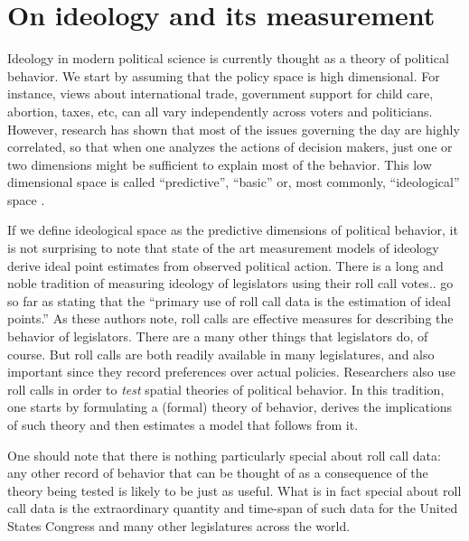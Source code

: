 \section{On   ideology and its measurement}

Ideology in modern political science is currently thought as a theory of political behavior. We  start by assuming that the policy space is high dimensional. For instance, views about international trade, government support for child care, abortion, taxes, etc, can all vary independently across voters and politicians. However, research  has shown that most of the issues governing the day are highly correlated, so that when one analyzes the actions of decision makers, just one or two dimensions might be sufficient to explain most of the behavior. This low dimensional space is called ``predictive'', ``basic'' \citep[p.13-14]{poole:2005} or, most commonly, ``ideological'' space \citep{hinich:1994}.   

If we define ideological space as the predictive dimensions of political behavior, it is not surprising to note that state of the art measurement models of ideology derive ideal point estimates from observed political action. There is a long and noble tradition of measuring  ideology of legislators using their roll call votes.\citep[e.g.]{poole:1997}. \citet[p.355]{clinton:2004} go so far as stating that the ``primary use of roll call data is the estimation of ideal points.''  As these authors note, roll calls are effective measures for  describing  the behavior of legislators. There are a many other things that legislators do, of course. But roll calls are both readily available in many legislatures, and also important since they record preferences over actual policies. Researchers also use roll calls in order to \emph{test} spatial theories of political behavior.  In this tradition, one starts by formulating a (formal) theory of behavior, derives the implications of such theory and then estimates a model that follows from it.\cite[p.9]{poole:2005} 

One should note that there is nothing particularly special about roll call data: any other record of behavior that can be thought of as a consequence of the theory being tested is likely to be just as useful. What is in fact special about roll call data is the extraordinary quantity and time-span of such data  for the United States Congress and many other legislatures across the world.


